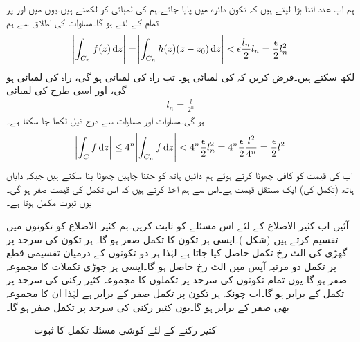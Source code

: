 ہم اب عدد  اتنا بڑا لیتے ہیں کہ تکون  دائرہ  میں پایا جائے۔ہم  کی لمبائی کو  لکھتے ہیں۔یوں  میں  اور   پر تمام  کے لئے   ہو گا۔مساوات  کی اطلاق سے ہم 
\begin{align}\label{مساوات_مخلوط_تکمل_قریبی_حد}
\abs{\int_{C_n} f(z)\dif z}=\abs{\int_{C_n} h(z)(z-z_0)\dif z}<\epsilon \frac{l_n}{2}l_n=\frac{\epsilon}{2}l_n^2 
\end{align}
لکھ سکتے ہیں۔فرض کریں کہ  کی لمبائی  ہو۔ تب راہ  کی لمبائی  ہو گی، راہ  کی لمبائی 
 ہو گی، اور اسی طرح  کی لمبائی 
\begin{align*}
l_n=\frac{l}{2^n}
\end{align*}
ہو گی۔مساوات  اور مساوات  سے درج ذیل لکھا جا سکتا ہے۔
\begin{align*}
\abs{\int_C f\dif z}\le 4^n \abs{\int_{C_n} f\dif z}< 4^n \frac{\epsilon}{2}l_n^2=4^n \frac{\epsilon}{2} \frac{l^2}{4^n}=\frac{\epsilon}{2}l^2
\end{align*}
اب  کی قیمت کو کافی چھوٹا  کرتے ہوئے ہم دائیں ہاتھ کو جتنا چاہیں چھوٹا بنا سکتے ہیں جبکہ دایاں ہاتھ (تکمل کی) ایک مستقل قیمت ہے۔اس سے ہم اخذ کرتے ہیں کہ اس تکمل کی قیمت صفر ہو گی۔یوں ثبوت مکمل ہوتا ہے۔

آئیں اب کثیر الاضلاع کے لئے اس مسئلے کو ثابت کریں۔ہم کثیر الاضلاع کو تکونوں میں تقسیم کرتے ہیں (شکل )۔ایسی ہر تکون کا تکمل صفر ہو گا۔ ہر تکون کی سرحد پر گھڑی کی الٹ رخ تکمل حاصل کیا جاتا ہے لہٰذا ہر دو تکونوں کے درمیان تقسیمی قطع پر تکمل دو مرتبہ آپس میں الٹ رخ حاصل ہو گا۔ایسی ہر جوڑی تکملات کا مجموعہ صفر ہو گا۔یوں تمام تکونوں کی سرحد پر تکملوں کا مجموعہ کثیر رکنی کی سرحد پر تکمل کے برابر ہو گا۔اب چونکہ ہر تکون پر تکمل صفر کے برابر  ہے لہٰذا ان کا مجموعہ بھی صفر کے برابر ہو گا۔یوں کثیر رکنی کی سرحد پر تکمل صفر ہو گا۔
\begin{figure}
\centering
{}
\caption{کثیر رکنے کے لئے کوشی مسئلہ تکمل کا ثبوت}
\label{شکل_مخلوط_تکمل_کثیر_رکنی_کی_سرحد}
\end{figure}

